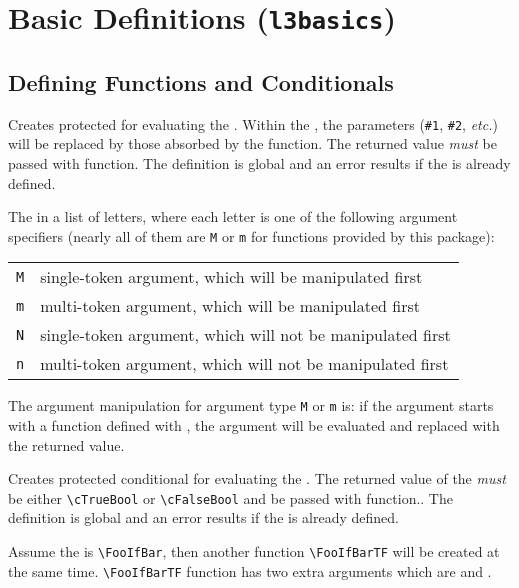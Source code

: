 \documentclass[oneside]{book}
\begin{document}
\chapter{Basic Definitions (\texttt{l3basics})}

\section{Deﬁning Functions and Conditionals}

\begin{function}{\PrgNewFunction}
\begin{syntax}
   
\end{syntax}
Creates protected  for evaluating the .
Within the , the parameters (\verb|#1|, \verb|#2|,
\emph{etc.}) will be replaced by those absorbed by the function.
The returned value \emph{must} be passed with  function.
The definition is global and an error results if the
 is already defined.\par
The  in a list of letters,
where each letter is one of the following argument specifiers
(nearly all of them are \texttt{M} or \texttt{m} for functions provided by this package):\par
{\centering\begin{tabular}{ll}
  \texttt{M} & single-token argument, which will be manipulated first \\
  \texttt{m} & multi-token argument, which will be manipulated first \\
  \texttt{N} & single-token argument, which will not be manipulated first \\
  \texttt{n} & multi-token argument, which will not be manipulated first \\
\end{tabular}\par}
The argument manipulation for argument type \texttt{M} or \texttt{m}
is: if the argument starts with a function defined with ,
the argument will be evaluated and replaced with the returned value.
\end{function}

\begin{function}{\PrgNewConditional}
\begin{syntax}
   
\end{syntax}
Creates protected conditional  for evaluating the .
The returned value of the  \emph{must} be either \verb!\cTrueBool!
or \verb!\cFalseBool! and be passed with  function..
The definition is global and an error results if the  is already defined.
\par
Assume the  is \verb!\FooIfBar!, then another function \verb!\FooIfBarTF!
will be created at the same time. \verb!\FooIfBarTF! function has two extra arguments
which are  and .\par
\end{function}
\end{document}
